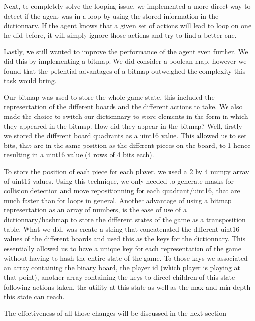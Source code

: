 \documentclass[11pt,a4paper]{report}
\begin{document}
\begin{answers}[21cm]
    Next, to completely solve the looping issue, we implemented a more direct way to detect if the agent was in a loop by using the 
    stored information in the dictionnary. If the agent knows that a given set of actions will lead to loop on one he did before,
    it will simply ignore those actions and try to find a better one. 

    Lastly, we still wanted to improve the performance of the agent even further. We did this by implementing a bitmap. 
    We did consider a boolean map, however we found that the potential advantages of a bitmap outweighed the complexity
    this task would bring. 

    Our bitmap was used to store the whole game state, this included the representation of the different boards and the 
    different actions to take. We also made the choice to switch our dictionnary to store elements in the form in which
    they appeared in the bitmap. How did they appear in the bitmap? Well, firstly we stored the different board quadrants
    as a uint16 value. This allowed us to set bits, that are in the same position as the different pieces on the board, to 1 hence resulting 
    in a uint16 value (4 rows of 4 bits each).  
\end{answers}

\begin{answers}[23cm]
    To store the position of each piece for each player, we used a 2 by 4 numpy array of uint16 values. Using this technique,
    we only needed to generate masks for collision detection and move repositionning for each quadrant/uint16, that are much faster than for loops in general. 
    Another advantage of using a bitmap representation as an array of numbers, is the ease of use of a dictionnary/hashmap to store the different states of the game as a transposition table.
    What we did, was create a string that concatenated the different uint16 values of the different boards and used this as the 
    keys for the dictionnary. This essentially allowed us to have a unique key for each representation of the game without 
    having to hash the entire state of the game. 
    To those keys we associated an array containing the binary board, the player id (which player is playing at that point),
    another array containing the keys to direct children of this state following actions taken, the utility at this state
    as well as the max and min depth this state can reach. 
    
    The effectiveness of all those changes will be discussed in the next section.
\end{answers}
\end{document}
